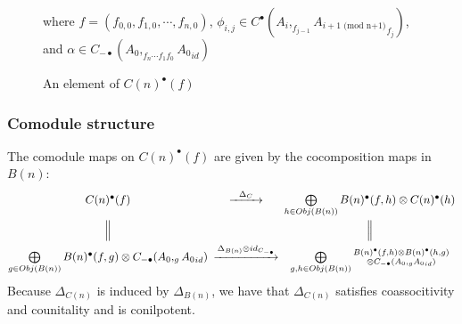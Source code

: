 \begin{figure}
\centerline{}
\caption{An element of $C(n)^\bullet(f)$}  \label{fig:phi|alpha}
where $f = (f_{0,0}, f_{1,0}, \cdots, f_{n,0})$, 
$\phi_{i,j} \in C^\bullet(A_i, _{f_{j-1}}
{A_{i+1 \textrm{ (mod n+1)}}}_{f_j})$, and 
$\alpha \in C_{-\bullet}(A_0, _{f_n\cdots f_1 f_0}
{A_0}_{id})$
\end{figure}
%
\subsubsection{Comodule structure}\label{sec:comod_strre}
The comodule maps on $C(n)^\bullet(f)$ are given by the
cocomposition maps in $B(n)$: 
%
\begin{equation*}
\begin{CD}
C(n)^\bullet(f) @>\Delta_C>>
\bigoplus\limits_{h \in Obj(B(n))} B(n)^\bullet(f,h) \otimes C(n)^\bullet(h) \\
@|  @| \\
\bigoplus\limits_{g \in Obj(B(n))} B(n)^\bullet(f,g) \otimes C_{-\bullet}(A_0, _g{A_0}_{id})
@>\Delta_{B(n)}\otimes id_{C_{-\bullet}}>>
\bigoplus\limits_{g,h\in Obj(B(n))} \substack{B(n)^\bullet(f,h)\otimes B(n)^\bullet(h,g) \\ \otimes 
C_{-\bullet}(A_0, _g{A_0}_{id})}
\end{CD} 
\end{equation*}
%
Because $\Delta_{C(n)}$ is induced by 
$\Delta_{B(n)}$, we have that $\Delta_{C(n)}$ 
satisfies coassocitivity and counitality 
and is conilpotent. 

